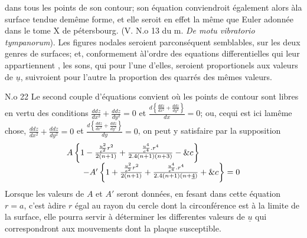 \documentclass[11pt,a4paper]{article}
\begin{document}

dans tous les points de son contour; son équation  conviendroit également alors àla surface
tendue demême forme, et elle seroit en effet la même
que Euler adonnée dans le tome X de pétersbourg. (V. N.o 13
du m. \emph{De motu vibratorio tympanorum}). Les figures
nodales seroient parconséquent semblables, sur les deux
genres de surfaces; et, conformement àl'ordre des
equations differentielles qui leur appartiennent  ,
les sons, qui pour l'une d'elles, seroient proportionels aux
valeurs de $\underline{u}$,  suivroient
pour l'autre la proportion des quarrés des mêmes
valeurs.

N.o 22 Le second couple d'équations convient  où les points de
contour sont libres en vertu des conditions $\frac{ddz}{dx^2} + \frac{ddz}{dy^2} = 0$
et $\frac{d\left\{\frac{ddz}{dx^2} + \frac{ddz}{dy^2}\right\}}{dx} = 0$; ou, cequi est ici lamême chose, $\frac{ddz}{dx^2} + \frac{ddz}{dy^2} = 0$
et $\frac{d\left\{\frac{ddz}{dx^2} + \frac{ddz}{dy^2}\right\}}{dy} = 0$, on peut y satisfaire par la supposition
\[ \begin{array}{l} A\left\{1 - \frac{\frac{u^2}{e^2}r^2}{2(n+1)} + \frac{\frac{u^4}{e^4}.r^4}{2.4(n+1)(n+3)} - \&c\right\} \\ \qquad - A'\left\{1 + \frac{\frac{u^2}{e^2}r^2}{2(n+1)} + \frac{\frac{u^4}{e^4}.r^4}{2.4(n+1)(n+\uncertain{4})} + \&c\right\} = 0 \end{array} \]
Lorsque les valeurs de $A$ et $A'$ seront données, en
 fesant dans cette équation $r = a$, c'est àdire
$r$ égal au rayon du cercle dont la circonférence est
à la limite de la surface, elle pourra servir à
déterminer les differentes valeurs de $\underline{u}$ qui correspondront
aux mouvements dont la plaque   susceptible.
\end{document}
